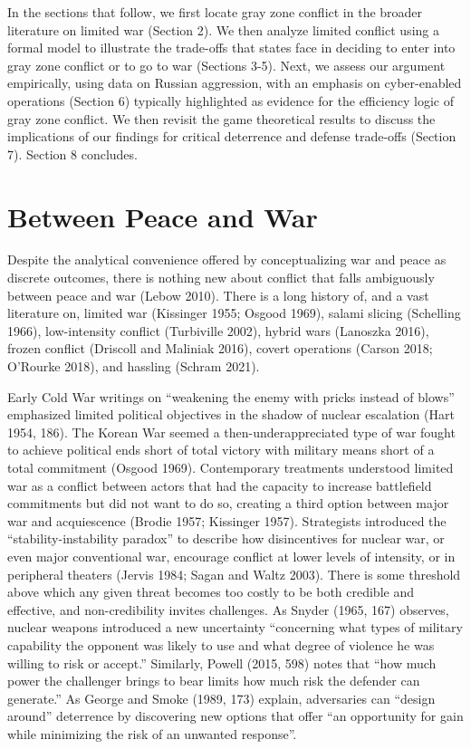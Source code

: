 \documentclass[
]{article}
\begin{document}
In the sections that follow, we first locate gray zone conflict in the broader literature on limited war (Section 2). We then analyze limited conflict using a formal model to illustrate the trade-offs that states face in deciding to enter into gray zone conflict or to go to war (Sections 3-5). Next, we assess our argument empirically, using data on Russian aggression, with an emphasis on cyber-enabled operations (Section 6) typically highlighted as evidence for the efficiency logic of gray zone conflict. We then revisit the game theoretical results to discuss the implications of our findings for critical deterrence and defense trade-offs (Section 7). Section 8 concludes.

\hypertarget{between-peace-and-war}{%
\section{Between Peace and War}\label{between-peace-and-war}}

Despite the analytical convenience offered by conceptualizing war and peace as discrete outcomes, there is nothing new about conflict that falls ambiguously between peace and war (Lebow 2010). There is a long history of, and a vast literature on, limited war (Kissinger 1955; Osgood 1969), salami slicing (Schelling 1966), low-intensity conflict (Turbiville 2002), hybrid wars (Lanoszka 2016), frozen conflict (Driscoll and Maliniak 2016), covert operations (Carson 2018; O'Rourke 2018), and hassling (Schram 2021).

Early Cold War writings on ``weakening the enemy with pricks instead of blows'' emphasized limited political objectives in the shadow of nuclear escalation (Hart 1954, 186). The Korean War seemed a then-underappreciated type of war fought to achieve political ends short of total victory with military means short of a total commitment (Osgood 1969). Contemporary treatments understood limited war as a conflict between actors that had the capacity to increase battlefield commitments but did not want to do so, creating a third option between major war and acquiescence (Brodie 1957; Kissinger 1957). Strategists introduced the ``stability-instability paradox'' to describe how disincentives for nuclear war, or even major conventional war, encourage conflict at lower levels of intensity, or in peripheral theaters (Jervis 1984; Sagan and Waltz 2003). There is some threshold above which any given threat becomes too costly to be both credible and effective, and non-credibility invites challenges. As Snyder (1965, 167) observes, nuclear weapons introduced a new uncertainty ``concerning what types of military capability the opponent was likely to use and what degree of violence he was willing to risk or accept.'' Similarly, Powell (2015, 598) notes that ``how much power the challenger brings to bear limits how much risk the defender can generate.'' As George and Smoke (1989, 173) explain, adversaries can ``design around'' deterrence by discovering new options that offer ``an opportunity for gain while minimizing the risk of an unwanted response''.
\end{document}
